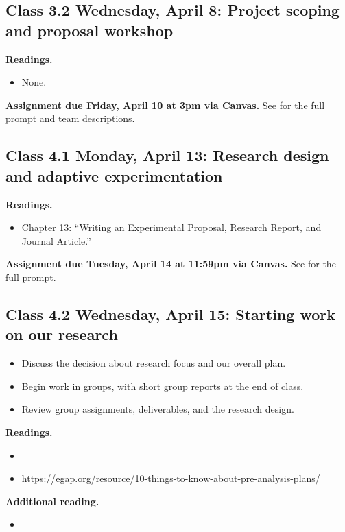 \documentclass[letterpaper, 12pt, parskip=full, DIV=10]{scrartcl}
\begin{document}
\subsection*{Class 3.2 Wednesday, April 8: Project scoping and proposal workshop}

\textbf{Readings.}
\begin{itemize}
\item None.
\end{itemize}

\textbf{Assignment due Friday, April 10 at 3pm via Canvas.}
See  for the full prompt and team descriptions.

\subsection*{Class 4.1 Monday, April 13: Research design and adaptive experimentation}
\textbf{Readings.}
\begin{itemize}
\item {} Chapter 13: ``Writing an Experimental Proposal, Research Report, and Journal Article.''
\end{itemize}

\textbf{Assignment due Tuesday, April 14 at 11:59pm via Canvas.}
See  for the full prompt.

\subsection*{Class 4.2 Wednesday, April 15: Starting work on our research}
\begin{itemize}
\item Discuss the decision about research focus and our overall plan.
\item Begin work in groups, with short group reports at the end of class.
\item Review group assignments, deliverables, and the research design.
\end{itemize}

\textbf{Readings.}
\begin{itemize}
\item {}
\item {} \url{https://egap.org/resource/10-things-to-know-about-pre-analysis-plans/}
\end{itemize}

\textbf{Additional reading.}
\begin{itemize}
\item {}
\end{itemize}
\end{document}
